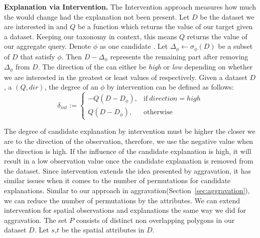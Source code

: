

{\bf {Explanation via Intervention.}} 
The Intervention approach measures how much the {\fact} would change had the explanation not been present. Let $D$ be the dataset we are interested in and $Q$ be a function which returns the value of our target {\fact} given a dataset. Keeping our taxonomy in context, this means $Q$ returns the value of our aggregate {\fact} query. Denote $\phi$ as one candidate {\explanation}. Let $\Delta_\phi \leftarrow \sigma_\phi(D)$ be a subset of $D$ that satisfy $\phi$. Then $D - \Delta_\phi$ represents the remaining part after removing $\Delta_\phi$ from $D$. The direction of the {\fact} can either be \textit{high} or \textit{low} depending on whether we are interested in the greatest or least values of {\fact} respectively. Given a dataset $D$, a {\fact}$(Q, dir)$, the degree of an {\explanation} $\phi$ by intervention can be defined as follows:
\begin{equation}
\delta_{int}:=
\begin{cases}
-Q(D-D_{\phi}), & \text{if}\ direction=high \\
Q(D-D_{\phi}), & \text{otherwise}
\end{cases}
\end{equation}

The degree of candidate explanation by intervention must be higher the closer we are to the direction of the observation, therefore, we use the negative value when the direction is high. If the influence of the candidate explanation is high, it will result in a low observation value once the candidate explanation is removed from the dataset.
Since intervention extends the idea presented by aggravation, it has similar issues when it comes to the number of permutations for candidate explanations. Similar to our approach in aggravation(Section~\ref{sec:aggravation}), we can reduce the number of permutations by  the attributes. We can extend intervention for spatial observations and explanations the same way we did for aggravation. The set $P$ consists of distinct non overlapping polygons in our dataset $D$. Let $s$,$t$ be the spatial attributes in $D$. 


